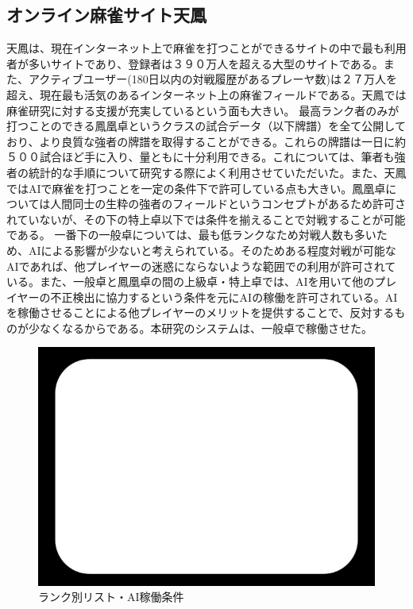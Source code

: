 \subsection{オンライン麻雀サイト天鳳}
天鳳は、現在インターネット上で麻雀を打つことができるサイトの中で最も利用者が多いサイトであり、登録者は３９０万人を超える大型のサイトである。また、アクティブユーザー(180日以内の対戦履歴があるプレーヤ数)は２７万人を超え、現在最も活気のあるインターネット上の麻雀フィールドである。天鳳では麻雀研究に対する支援が充実しているという面も大きい。
最高ランク者のみが打つことのできる鳳凰卓というクラスの試合データ（以下牌譜）を全て公開しており、より良質な強者の牌譜を取得することができる。これらの牌譜は一日に約５００試合ほど手に入り、量ともに十分利用できる。これについては、筆者も強者の統計的な手順について研究する際によく利用させていただいた。また、天鳳ではAIで麻雀を打つことを一定の条件下で許可している点も大きい。鳳凰卓については人間同士の生粋の強者のフィールドというコンセプトがあるため許可されていないが、その下の特上卓以下では条件を揃えることで対戦することが可能である。
一番下の一般卓については、最も低ランクなため対戦人数も多いため、AIによる影響が少ないと考えられている。そのためある程度対戦が可能なAIであれば、他プレイヤーの迷惑にならないような範囲での利用が許可されている。また、一般卓と鳳凰卓の間の上級卓・特上卓では、AIを用いて他のプレイヤーの不正検出に協力するという条件を元にAIの稼働を許可されている。AIを稼働させることによる他プレイヤーのメリットを提供することで、反対するものが少なくなるからである。本研究のシステムは、一般卓で稼働させた。


\begin{figure}[h]
 \centering
 \includegraphics[keepaspectratio, scale=0.5,bb=0 0 620 439]
      {img/zu.jpg}
 \caption{ランク別リスト・AI稼働条件}
 \label{zu}
\end{figure}

